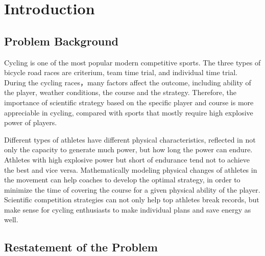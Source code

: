 \documentclass{mcmthesis}
\begin{document}
\maketitle
\tableofcontents
\newpage
	\section{Introduction}
\subsection{Problem Background}

Cycling is one of the most popular modern competitive sports. The three types of bicycle road races are criterium, team time trial, and individual time trial. During the cycling races，many factors affect the outcome, including ability of the player, weather conditions, the course and the strategy. Therefore, the importance of scientific strategy based on the specific player and course is more appreciable in cycling, compared with sports that mostly require high explosive power of players.

Different types of athletes have different physical characteristics, reflected in not only the capacity to generate much power, but how long the power can endure. Athletes with high explosive power but short of endurance tend not to achieve the best and vice versa. Mathematically modeling physical changes of athletes in the movement can help coaches to develop the optimal strategy, in order to minimize the time of covering the course for a given physical ability of the player. Scientific competition strategies can not only help top athletes break records, but make sense for cycling enthusiasts to make individual plans and save energy as well.




\subsection{Restatement of the Problem}
\end{document}
